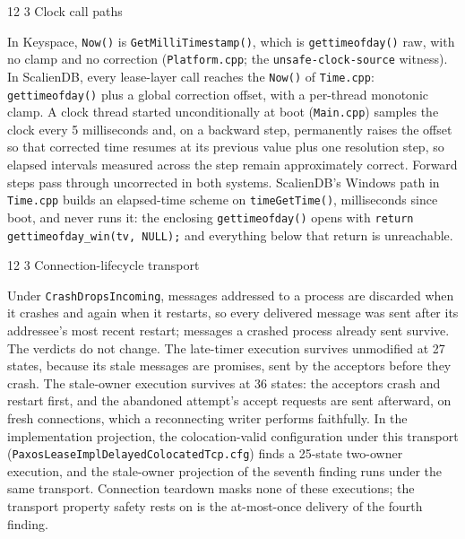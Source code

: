 \documentclass[final,5p,times,twocolumn,number]{elsarticle}
\makeatletter
\newcommand{\code}[1]{\texttt{#1}}
\renewcommand\subsection{\@startsection{subsection}{2}{\z@}%
           {12\p@ \@plus 6\p@ \@minus 3\p@}%
           {3\p@ \@plus 6\p@ \@minus 3\p@}%
           {\normalfont\normalsize\bfseries}}
\makeatother
\begin{document}
\subsection{Clock call paths}

In Keyspace, \code{Now()} is \code{GetMilliTimestamp()}, which is \code{gettimeofday()} raw, with no clamp and no correction (\code{Platform.cpp}; the \code{unsafe-clock-source} witness).  In ScalienDB, every lease-layer call reaches the \code{Now()} of \code{Time.cpp}: \code{gettimeofday()} plus a global correction offset, with a per-thread monotonic clamp.  A clock thread started unconditionally at boot (\code{Main.cpp}) samples the clock every 5 milliseconds and, on a backward step, permanently raises the offset so that corrected time resumes at its previous value plus one resolution step, so elapsed intervals measured across the step remain approximately correct.  Forward steps pass through uncorrected in both systems.  ScalienDB's Windows path in \code{Time.cpp} builds an elapsed-time scheme on \code{timeGetTime()}, milliseconds since boot, and never runs it: the enclosing \code{gettimeofday()} opens with \code{return gettimeofday\_win(tv, NULL);} and everything below that return is unreachable.

\subsection{Connection-lifecycle transport}

Under \code{CrashDropsIncoming}, messages addressed to a process are discarded when it crashes and again when it restarts, so every delivered message was sent after its addressee's most recent restart; messages a crashed process already sent survive.  The verdicts do not change.  The late-timer execution survives unmodified at 27 states, because its stale messages are promises, sent by the acceptors before they crash.  The stale-owner execution survives at 36 states: the acceptors crash and restart first, and the abandoned attempt's accept requests are sent afterward, on fresh connections, which a reconnecting writer performs faithfully.  In the implementation projection, the colocation-valid configuration under this transport (\code{PaxosLeaseImplDelayedColocatedTcp.cfg}) finds a 25-state two-owner execution, and the stale-owner projection of the seventh finding runs under the same transport.  Connection teardown masks none of these executions; the transport property safety rests on is the at-most-once delivery of the fourth finding.
\end{document}
